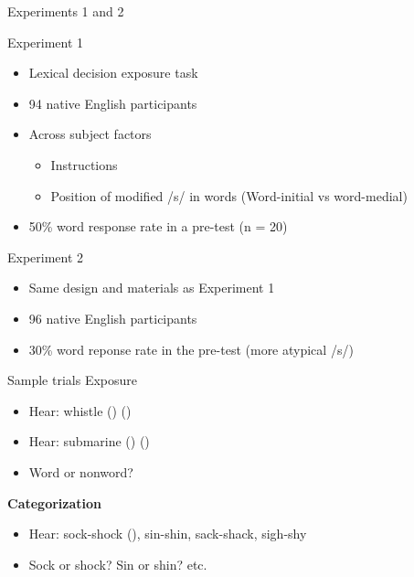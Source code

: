 \documentclass{beamer}
\begin{document}
\begin{frame}{Experiments 1 and 2}

Experiment 1
\begin{itemize}
\item Lexical decision exposure task
\item 94 native English participants
\item Across subject factors
\begin{itemize}
\item Instructions
\item Position of modified /s/ in words (Word-initial vs word-medial)
\end{itemize}
\item 50\% word response rate in a pre-test (n = 20)
\end{itemize}
Experiment 2
\begin{itemize}
\item Same design and materials as Experiment 1
\item 96 native English participants
\item 30\% word reponse rate in the pre-test (more atypical /s/)
\end{itemize}
\end{frame}

\begin{frame}{Sample trials}
Exposure
\begin{itemize}
\item Hear: whistle () ()
\item Hear: submarine () ()
\item Word or nonword?
\end{itemize}
\textbf{Categorization}
\begin{itemize}
\item Hear: sock-shock (), sin-shin, sack-shack, sigh-shy
\item Sock or shock? Sin or shin? etc.
\end{itemize}
\end{frame}
\end{document}
